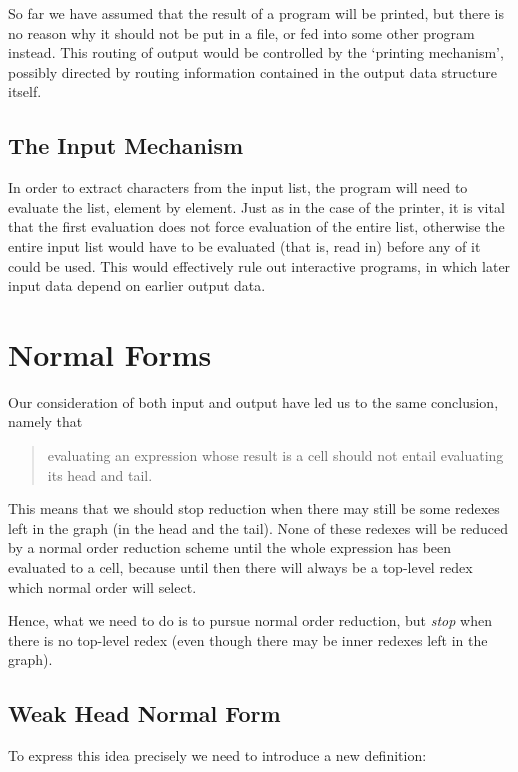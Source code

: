 So far we have assumed that the result of a program will be printed, but
there is no reason why it should not be put in a file, or fed into some other
program instead. This routing of output would be controlled by the `printing
mechanism', possibly directed by routing information contained in the output
data structure itself.

\subsection{The Input Mechanism}

In order to extract characters from the input list, the program will need to
evaluate the list, element by element. Just as in the case of the printer, it is
vital that the first evaluation does not force evaluation of the entire list,
otherwise the entire input list would have to be evaluated (that is, read in)
before any of it could be used. This would effectively rule out interactive
programs, in which later input data depend on earlier output data.

\section{Normal Forms}

Our consideration of both input and output have led us to the same
conclusion, namely that
\begin{quote}
    evaluating an expression whose result is a  cell should not entail
    evaluating its head and tail.
\end{quote}
This means that we should stop reduction when there may still be some
redexes left in the graph (in the head and the tail). None of these redexes will
be reduced by a normal order reduction scheme until the whole expression
has been evaluated to a  cell, because until then there will always be a
top-level redex which normal order will select.

Hence, what we need to do is to pursue normal order reduction, but \textit{stop}
when there is no top-level redex (even though there may be inner redexes left
in the graph).

\subsection{Weak Head Normal Form}

To express this idea precisely we need to introduce a new definition:

